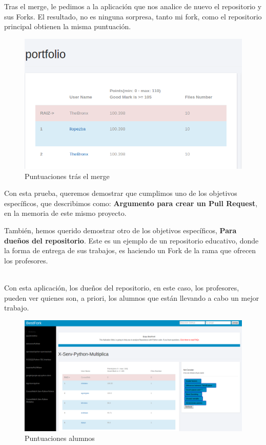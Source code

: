 \documentclass[a4paper, 12pt]{book}
\begin{document}
Tras el merge, le pedimos a la aplicación que nos analice de nuevo el repositorio y sus Forks. El resultado, no es ninguna sorpresa, tanto mi fork, como el repositorio principal obtienen la misma puntuación.
\begin{figure}[H]
\centering
\includegraphics[scale=0.35]{img/puntuacionigual.png} 
\caption{Puntuaciones trás el merge}
\end{figure}
Con esta prueba, queremos demostrar que cumplimos uno de los objetivos específicos, que describimos como: \textbf{ Argumento para crear un Pull Request}, en la memoria de este mismo proyecto.

También, hemos querido demostrar otro de los objetivos específicos, \textbf{Para dueños del repositorio}. Este es un ejemplo de un repositorio educativo, donde la forma de entrega de sus trabajos, es haciendo un Fork de la rama que ofrecen los profesores.\\\

Con esta aplicación, los dueños del repositorio, en este caso, los profesores, pueden ver quienes son, a priori, los alumnos que están llevando a cabo un mejor trabajo. 

\begin{figure}[H]
\centering
\includegraphics[scale=0.35]{img/puntalumnos.png} 
\caption{Puntuaciones alumnos}
\end{figure}
\end{document}
